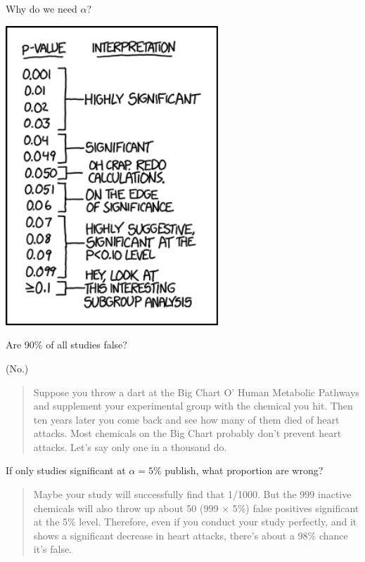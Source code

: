 \begin{frame}{Why do we need $\alpha$?}

    \begin{center}
        \includegraphics[width=0.6\textwidth]{p_values}
    \end{center}

\end{frame}



\begin{frame}{Are 90\% of all studies false?}

        (No.)

    \vspace{2em}
    \pause

    \begin{quote}
        \small
        Suppose you throw a dart at the Big Chart O' Human Metabolic Pathways and supplement your experimental group with the chemical you hit. Then ten years later you come back and see how many of them died of heart attacks.
        Most chemicals on the Big Chart probably don't prevent heart attacks. Let's say only one in a thousand do. 
    \end{quote}

    \vspace{1em}

    If only studies significant at $\alpha=5\%$ publish,
    what proportion are wrong?

    \vspace{1em}
        
    \begin{quote}
        \pause Maybe your study will successfully find that 1/1000. But the 999 inactive chemicals will also throw up about 50 (999 $\times$ 5\%) false positives significant at the 5\% level. Therefore, even if you conduct your study perfectly, and it shows a significant decrease in heart attacks, there's about a 98\% chance it's false.
    \end{quote}


\end{frame}

